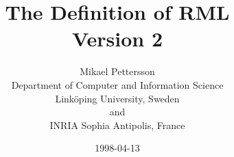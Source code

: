 \documentclass[11pt,a4paper,titlepage]{article}
\begin{document}

\title{		The Definition of RML \\
		Version 2}
\author{	Mikael Pettersson \\
		Department of Computer and Information Science \\
		Link{\"o}ping University, Sweden \\
		and \\
		INRIA Sophia Antipolis, France}
\date{		1998-04-13}
\maketitle

\tableofcontents



\clearpage
\setcounter{page}{1}











\end{document}
